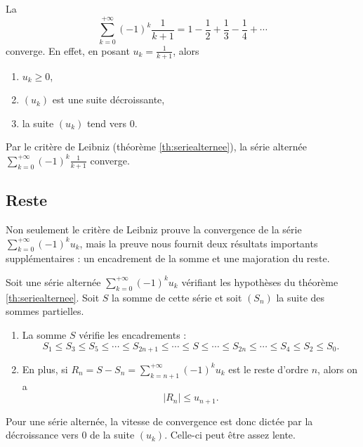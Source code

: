 \documentclass[class=report,crop=false]{standalone}
\begin{document}
\begin{exemple}
La  
$$\sum_{k=0}^{+\infty} (-1)^{k} \frac{1}{k+1} = 1-\frac{1}{2}+\frac{1}{3}-\frac{1}{4} + \cdots $$
converge.
En effet, en posant $u_k = \frac{1}{k+1}$, alors
\begin{enumerate}
  \item $u_k\ge0$,
  \item $(u_k)$ est une suite décroissante,
  \item la suite $(u_k)$ tend vers $0$.
\end{enumerate}
Par le critère de Leibniz (théorème \ref{th:seriealternee}), la série alternée
$\sum_{k=0}^{+\infty} (-1)^{k} \frac{1}{k+1}$ converge.
\end{exemple}

\subsection{Reste}

Non seulement le critère de Leibniz prouve la convergence de la série 
$\sum_{k=0}^{+\infty} (-1)^k u_k$, mais la preuve nous fournit deux résultats importants supplémentaires :
un encadrement de la somme et une majoration du reste.

\begin{corollaire}
Soit une série alternée $\displaystyle \sum_{k=0}^{+\infty} (-1)^k u_k$ vérifiant 
les hypothèses du théorème \ref{th:seriealternee}.
Soit $S$ la somme de cette série et soit $(S_n)$ la suite des sommes partielles.
\begin{enumerate}
  \item La somme $S$ vérifie les encadrements :
  $$ S_1\le S_3\le S_5\le \cdots \le S_{2n+1} \le \cdots \le S 
  \le  \cdots\le S_{2n} \le \cdots\le S_4\le S_2\le S_0.$$
  \item En plus, si $\displaystyle R_n=S-S_n =\sum_{k=n+1}^{+\infty} (-1)^k u_k$ est le reste d'ordre $n$, alors on  a
$$\big|R_n\big|\le u_{n+1}.$$  
\end{enumerate}
\end{corollaire}

Pour une série alternée, la vitesse de convergence est donc
dictée par la décroissance vers $0$ de la suite $(u_k)$. Celle-ci
peut être assez lente.
\end{document}
